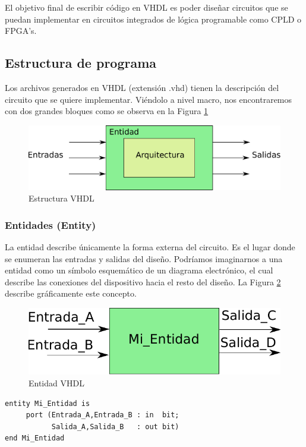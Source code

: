 El objetivo final de escribir código en VHDL es poder diseñar circuitos que se puedan implementar en circuitos integrados de lógica
programable como CPLD o FPGA's.

\subsection{Estructura de programa}
Los archivos generados en VHDL (extensión .vhd) tienen la descripción del circuito que se quiere implementar. Viéndolo a nivel macro, 
nos encontraremos con dos grandes bloques como se observa en la Figura \ref{vhdlbloque}

\begin{figure}[h]
  \centering
    \includegraphics[width=.85\textwidth]{graficos/vhdl.pdf}
  \caption{Estructura VHDL}
  \label{vhdlbloque}
\end{figure}

\subsubsection{Entidades (Entity)}
La entidad describe únicamente la forma externa del circuito. Es el lugar donde se enumeran las entradas y salidas del diseño.
Podríamos imaginarnos a una entidad como un símbolo esquemático de un diagrama electrónico, el cual describe las conexiones del 
dispositivo hacia el resto del diseño.
La Figura \ref{entidad} describe gráficamente este concepto.

\begin{figure}[h]
  \centering
    \includegraphics[width=.5\textwidth]{graficos/entidad.pdf}
  \caption{Entidad VHDL}
  \label{entidad}
\end{figure}


\begin{lstlisting}[style=vhdl]
entity Mi_Entidad is
     port (Entrada_A,Entrada_B : in  bit;
           Salida_A,Salida_B   : out bit)
end Mi_Entidad
\end{lstlisting}

